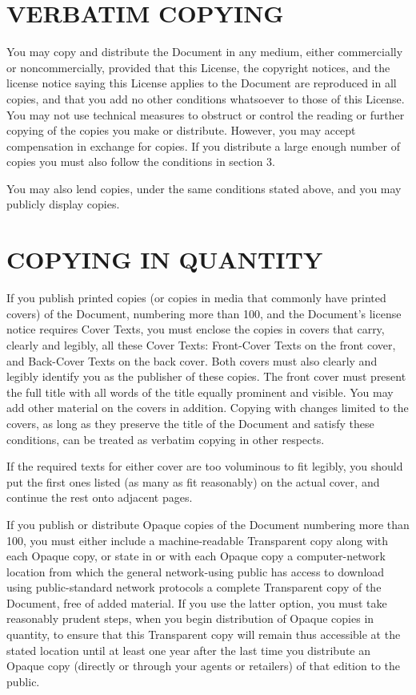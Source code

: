 \documentclass{stacks-project-book}
\theoremstyle{plain}
\theoremstyle{definition}
\theoremstyle{remark}
\numberwithin{equation}{subsection}
\begin{document}
\section{VERBATIM COPYING}
\label{fdl-section-verbatim-copying}

You may copy and distribute the Document in any medium, either
commercially or noncommercially, provided that this License, the
copyright notices, and the license notice saying this License applies
to the Document are reproduced in all copies, and that you add no other
conditions whatsoever to those of this License.  You may not use
technical measures to obstruct or control the reading or further
copying of the copies you make or distribute.  However, you may accept
compensation in exchange for copies.  If you distribute a large enough
number of copies you must also follow the conditions in section 3.

You may also lend copies, under the same conditions stated above, and
you may publicly display copies.


\section{COPYING IN QUANTITY}
\label{fdl-section-copying-in-quantity}


If you publish printed copies (or copies in media that commonly have
printed covers) of the Document, numbering more than 100, and the
Document's license notice requires Cover Texts, you must enclose the
copies in covers that carry, clearly and legibly, all these Cover
Texts: Front-Cover Texts on the front cover, and Back-Cover Texts on
the back cover.  Both covers must also clearly and legibly identify
you as the publisher of these copies.  The front cover must present
the full title with all words of the title equally prominent and
visible.  You may add other material on the covers in addition.
Copying with changes limited to the covers, as long as they preserve
the title of the Document and satisfy these conditions, can be treated
as verbatim copying in other respects.

If the required texts for either cover are too voluminous to fit
legibly, you should put the first ones listed (as many as fit
reasonably) on the actual cover, and continue the rest onto adjacent
pages.

If you publish or distribute Opaque copies of the Document numbering
more than 100, you must either include a machine-readable Transparent
copy along with each Opaque copy, or state in or with each Opaque copy
a computer-network location from which the general network-using
public has access to download using public-standard network protocols
a complete Transparent copy of the Document, free of added material.
If you use the latter option, you must take reasonably prudent steps,
when you begin distribution of Opaque copies in quantity, to ensure
that this Transparent copy will remain thus accessible at the stated
location until at least one year after the last time you distribute an
Opaque copy (directly or through your agents or retailers) of that
edition to the public.
\end{document}
